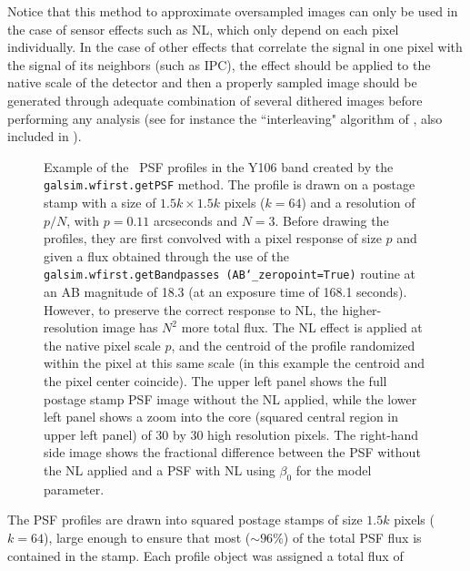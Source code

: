 \documentclass[11pt,preprint,flushrt]{aastex}
\begin{document}

Notice that this method to approximate oversampled images can only be used in the case of sensor effects such as NL, which only depend on each pixel individually. In the case of other effects that correlate the signal in one pixel with the signal of its neighbors (such as IPC), the effect should be applied to the native scale of the detector and then a properly sampled image should be generated through adequate combination of several dithered images before performing any analysis (see for instance the ``interleaving" algorithm of \citealt{kannawadi15}, also included in \gs). 

\begin{figure}[!ht]
\centering
{}
\caption{Example of the \wfa\ PSF profiles in the Y106 band created by the {\tt{galsim.wfirst.getPSF}} method. The profile is drawn on a postage stamp with a size of $1.5k \times1.5k$ pixels ($k=64$) and a resolution of $p/N$, with $p=0.11$ arcseconds and $N=3$. Before drawing the profiles, they are first convolved with a pixel response of size $p$ and given a flux obtained through the use of the {\tt{galsim.wfirst.getBandpasses (AB\char`_zeropoint=True)}} routine at an AB magnitude of 18.3 (at an exposure time of 168.1 seconds). However, to preserve the correct response to NL, the higher-resolution image has $N^2$ more total flux. The NL effect is applied at the native pixel scale $p$, and the centroid of the profile randomized within the pixel at this same scale (in this example the centroid and the pixel center coincide). The upper left panel shows the full postage stamp PSF image without the NL applied, while the lower left panel shows a zoom into the core (squared central region in upper left panel) of 30 by 30 high resolution pixels. The right-hand side image shows the fractional difference between the PSF without the NL applied and a PSF with NL using $\beta_0$ for the model parameter.} 
\label{f1}
\end{figure}

The PSF profiles are drawn into squared postage stamps of size $1.5k$ pixels ($k=64$), large enough to ensure that most ($\sim 96\%$) of the total PSF flux is contained in the stamp. %
Each profile object was assigned a total flux of 
\end{document}

